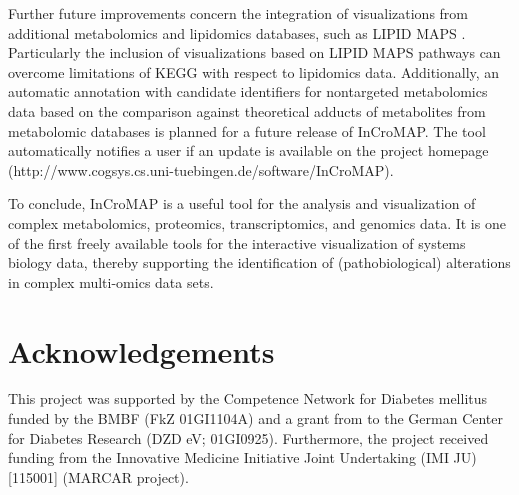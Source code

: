 \documentclass[final,5p,times,twocolumn]{elsarticle}
\begin{document}
Further future improvements concern the integration of visualizations from additional metabolomics and lipidomics databases, such as LIPID MAPS \cite{Sud2007}. Particularly the inclusion of visualizations based on LIPID MAPS pathways can overcome limitations of KEGG with respect to lipidomics data. Additionally, an automatic annotation with candidate identifiers for nontargeted metabolomics data based on the comparison against theoretical adducts of metabolites from metabolomic databases is planned for a future release of InCroMAP. The tool automatically notifies a user if an update is available on the project homepage (http://www.cogsys.cs.uni-tuebingen.de/software/InCroMAP).

To conclude, InCroMAP is a useful tool for the analysis and visualization of complex metabolomics, proteomics, transcriptomics, and genomics data. It is one of the first freely available tools for the interactive visualization of systems biology data, thereby supporting the identification of (pathobiological) alterations in complex multi-omics data sets.

\section{Acknowledgements}
This project was supported by the Competence Network for Diabetes mellitus funded
by the BMBF (FkZ 01GI1104A) and a grant from to the German Center for Diabetes Research (DZD eV; 01GI0925). Furthermore, the project received funding from the Innovative Medicine Initiative Joint Undertaking (IMI JU) [115001] (MARCAR project).














\end{document}
